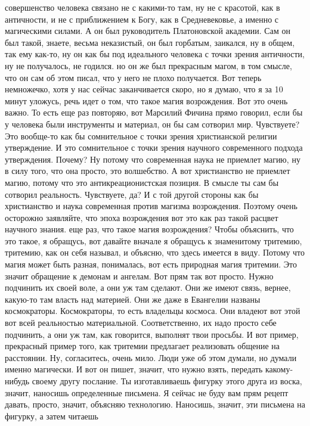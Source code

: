 совершенство человека связано не с какими-то там, ну не с красотой, как в
античности, и не с приближением к Богу, как в Средневековье, а именно с
магическими силами. А он был руководитель Платоновской академии. Сам он был
такой, знаете, весьма неказистый, он был горбатым, заикался, ну в общем, так ему
как-то, ну он как бы под идеального человека с точки зрения античности, ну не
получалось, не годился. но он же был прекрасным магом, в том смысле, что он сам
об этом писал, что у него не плохо получается. Вот теперь немножечко, хотя у нас
сейчас заканчивается скоро, но я думаю, что я за 10 минут уложусь, речь идет о
том, что такое магия возрождения. Вот это очень важно. То есть еще раз повторяю,
вот Марсилий Фичина прямо говорил, если бы у человека были инструменты и
материал, он бы сам сотворил мир. Чувствуете? Это вообще-то как бы сомнительное
с точки зрения христианской религии утверждение. И это сомнительное с точки
зрения научного современного подхода утверждения. Почему? Ну потому что
современная наука не приемлет магию, ну в силу того, что она просто, это
волшебство. А вот христианство не приемлет магию, потому что это
антикреационистская позиция. В смысле ты сам бы сотворил реальность. Чувствуете,
да? И с той другой стороны как бы христианство и наука современная против
магизма возрождения. Поэтому очень осторожно заявляйте, что эпоха возрождения
вот это как раз такой расцвет научного знания. еще раз, что такое магия
возрождения? Чтобы объяснить, что это такое, я обращусь, вот давайте вначале я
обращусь к знаменитому тритемию, тритемию, как он себя называл, и объясню, что
здесь имеется в виду. Потому что магия может быть разная, понималась, вот есть
природная магия тритемии. Это значит обращение к демонам и ангелам. Вот прям так
вот просто. Нужно подчинить их своей воле, а они уж там сделают. Они же имеют
связь, вернее, какую-то там власть над материей. Они же даже в Евангелии названы
космократоры. Космократоры, то есть владельцы космоса. Они владеют вот этой вот
всей реальностью материальной. Соответственно, их надо просто себе подчинить, а
они уж там, как говорится, выполнят твои просьбы. И вот пример, прекрасный
пример того, как тритемии предлагает реализовать общение на расстоянии. Ну,
согласитесь, очень мило. Люди уже об этом думали, но думали именно магически. И
вот он пишет, значит, что нужно взять, передать какому-нибудь своему другу
послание. Ты изготавливаешь фигурку этого друга из воска, значит, наносишь
определенные письмена. Я сейчас не буду вам прям рецепт давать, просто, значит,
объясняю технологию. Наносишь, значит, эти письмена на фигурку, а затем читаешь

